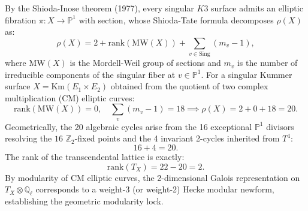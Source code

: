 \documentclass[11pt,a4paper]{article}
\begin{document}
By the Shioda-Inose theorem (1977), every singular $K3$ surface admits an elliptic fibration $\pi : X \to \mathbb{P}^1$ with section, whose Shioda-Tate formula decomposes $\rho(X)$ as:
\begin{equation}
    \rho(X) = 2 + \mathrm{rank}(\mathrm{MW}(X)) + \sum_{v \in \mathrm{Sing}} (m_v - 1),
\end{equation}
where $\mathrm{MW}(X)$ is the Mordell-Weil group of sections and $m_v$ is the number of irreducible components of the singular fiber at $v \in \mathbb{P}^1$. For a singular Kummer surface $X = \mathrm{Km}(E_1 \times E_2)$ obtained from the quotient of two complex multiplication (CM) elliptic curves:
\begin{equation}
    \mathrm{rank}(\mathrm{MW}(X)) = 0, \quad \sum_{v} (m_v - 1) = 18 \implies \rho(X) = 2 + 0 + 18 = 20.
\end{equation}
Geometrically, the 20 algebraic cycles arise from the 16 exceptional $\mathbb{P}^1$ divisors resolving the $16$ $\mathbb{Z}_2$-fixed points and the 4 invariant 2-cycles inherited from $T^4$:
\begin{equation}
    16 + 4 = 20.
\end{equation}
The rank of the transcendental lattice is exactly:
\begin{equation}
    \mathrm{rank}(T_X) = 22 - 20 = 2.
\end{equation}
By modularity of CM elliptic curves, the 2-dimensional Galois representation on $T_X \otimes \mathbb{Q}_\ell$ corresponds to a weight-3 (or weight-2) Hecke modular newform, establishing the geometric modularity lock.
\end{document}
